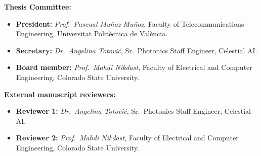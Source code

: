 \textbf{Thesis Committee:}

\begin{itemize}
	\item \textbf{President:} \textit{Prof.~Pascual Muñoz Muñoz}, Faculty of Telecommunications Engineering, Universitat Politècnica de València.
	\item \textbf{Secretary:} \textit{Dr.~Angelina Totović}, Sr.~Photonics Staff Engineer, Celestial AI.
	\item \textbf{Board member:} \textit{Prof.~Mahdi Nikdast}, Faculty of Electrical and Computer Engineering, Colorado State University.
\end{itemize}

\textbf{External manuscript reviewers:}
\begin{itemize}
	\item \textbf{Reviewer 1:} \textit{Dr.~Angelina Totović}, Sr.~Photonics Staff Engineer, Celestial AI.
	\item \textbf{Reviewer 2:} \textit{Prof.~Mahdi Nikdast}, Faculty of Electrical and Computer Engineering, Colorado State University.
\end{itemize}
\newpage
